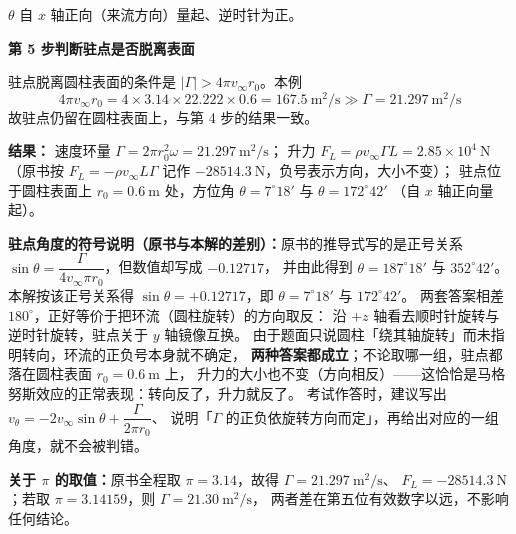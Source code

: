 \begin{jie}
$\theta$ 自 $x$ 轴正向（来流方向）量起、逆时针为正。

\textbf{第 5 步\quad 判断驻点是否脱离表面}

驻点脱离圆柱表面的条件是 $|\Gamma|>4\pi v_\infty r_0$。本例
\[ 4\pi v_\infty r_0=4\times3.14\times22.222\times0.6=167.5\ \mathrm{m^2/s}
 \gg\Gamma=21.297\ \mathrm{m^2/s} \]
故驻点仍留在圆柱表面上，与第 4 步的结果一致。

\textbf{结果：}
速度环量 $\Gamma=2\pi r_0^2\omega=21.297\ \mathrm{m^2/s}$；
升力 $F_L=\rho v_\infty\Gamma L=2.85\times10^4\ \mathrm{N}$
（原书按 $F_L=-\rho v_\infty L\Gamma$ 记作 $-28514.3\ \mathrm{N}$，负号表示方向，大小不变）；
驻点位于圆柱表面上 $r_0=0.6\ \mathrm{m}$ 处，方位角 $\theta=7^\circ18'$ 与 $\theta=172^\circ42'$
（自 $x$ 轴正向量起）。
\end{jie}

\begin{tishi}
\textbf{驻点角度的符号说明（原书与本解的差别）：}原书的推导式写的是正号关系
$\sin\theta=\dfrac{\Gamma}{4v_\infty\pi r_0}$，但数值却写成 $-0.12717$，
并由此得到 $\theta=187^\circ18'$ 与 $352^\circ42'$。
本解按该正号关系得 $\sin\theta=+0.12717$，即 $\theta=7^\circ18'$ 与 $172^\circ42'$。
两套答案相差 $180^\circ$，正好等价于把环流（圆柱旋转）的方向取反：
沿 $+z$ 轴看去顺时针旋转与逆时针旋转，驻点关于 $y$ 轴镜像互换。
由于题面只说圆柱「绕其轴旋转」而未指明转向，环流的正负号本身就不确定，
\textbf{两种答案都成立}；不论取哪一组，驻点都落在圆柱表面 $r_0=0.6\ \mathrm{m}$ 上，
升力的大小也不变（方向相反）——这恰恰是马格努斯效应的正常表现：转向反了，升力就反了。
考试作答时，建议写出 $v_\theta=-2v_\infty\sin\theta+\dfrac{\Gamma}{2\pi r_0}$、
说明「$\Gamma$ 的正负依旋转方向而定」，再给出对应的一组角度，就不会被判错。

\textbf{关于 $\pi$ 的取值：}原书全程取 $\pi=3.14$，故得 $\Gamma=21.297\ \mathrm{m^2/s}$、
$F_L=-28514.3\ \mathrm{N}$；若取 $\pi=3.14159$，则 $\Gamma=21.30\ \mathrm{m^2/s}$，
两者差在第五位有效数字以远，不影响任何结论。
\end{tishi}
